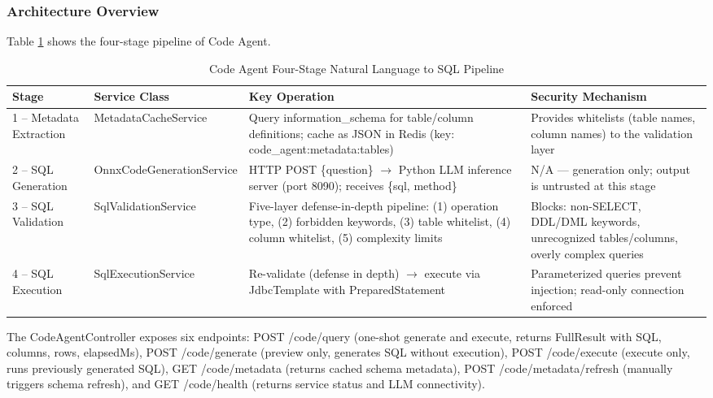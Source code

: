 \subsubsection{Architecture Overview}

Table \ref{tab:code-agent-pipeline} shows the four-stage pipeline of Code Agent.

\vspace{3mm}

\begin{table}[H]
\small\singlespacing
\centering
\caption{Code Agent Four-Stage Natural Language to SQL Pipeline}
\label{tab:code-agent-pipeline}
\vspace{2mm}

{\small
\begin{tabular}{@{}p{1.8cm}>{\raggedright\arraybackslash}p{3.8cm}p{4.3cm}>{\raggedright\arraybackslash}p{\dimexpr\textwidth-9.9cm-6\tabcolsep\relax}@{}}
\toprule
\textbf{Stage} & \textbf{Service Class} & \textbf{Key Operation} & \textbf{Security Mechanism} \\
\midrule
1 -- Metadata Extraction & Metadata\-Cache\-Service & Query information\_schema for table/column definitions; cache as JSON in Redis (key: code\_agent:metadata:tables) & Provides whitelists (table names, column names) to the validation layer \\
2 -- SQL Generation & Onnx\-Code\-Generation\-Service & HTTP POST \{question\} $\rightarrow$ Python LLM inference server (port 8090); receives \{sql, method\} & N/A --- generation only; output is untrusted at this stage \\
3 -- SQL Validation & Sql\-Validation\-Service & Five-layer defense-in-depth pipeline: (1) operation type, (2) forbidden keywords, (3) table whitelist, (4) column whitelist, (5) complexity limits & Blocks: non-SELECT, DDL/DML keywords, unrecognized tables/columns, overly complex queries \\
4 -- SQL Execution & Sql\-Execution\-Service & Re-validate (defense in depth) $\rightarrow$ execute via Jdbc\-Template with Prepared\-Statement & Parameterized queries prevent injection; read-only connection enforced \\
\bottomrule
\end{tabular}
}
\end{table}


The CodeAgentController exposes six endpoints: POST /code/query (one-shot generate and execute, returns FullResult with SQL, columns, rows, elapsedMs), POST /code/generate (preview only, generates SQL without execution), POST /code/execute (execute only, runs previously generated SQL), GET /code/metadata (returns cached schema metadata), POST /code/metadata/refresh (manually triggers schema refresh), and GET /code/health (returns service status and LLM connectivity).

